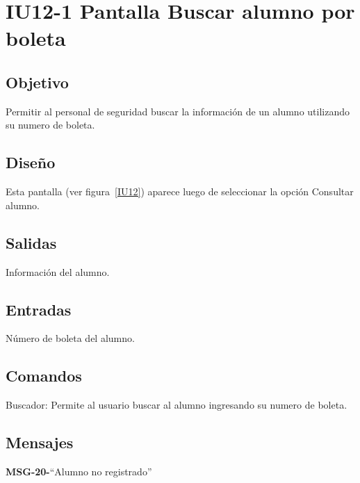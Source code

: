 \section{IU12-1 Pantalla Buscar alumno por boleta}

\subsection{Objetivo}
	Permitir al personal de seguridad buscar la información de un alumno utilizando su numero de boleta. 

\subsection{Diseño}
	Esta pantalla  (ver figura~\ref{IU12}) aparece luego de seleccionar la opción Consultar alumno. 


\subsection{Salidas}
	Información del alumno.

\subsection{Entradas}
Número de boleta del alumno. 

\subsection{Comandos}
Buscador: Permite al usuario buscar al alumno ingresando su numero de boleta. 

\subsection{Mensajes}

\begin{Citemize}
	\item {\bf MSG-20-}{``Alumno no registrado''}
\end{Citemize}

